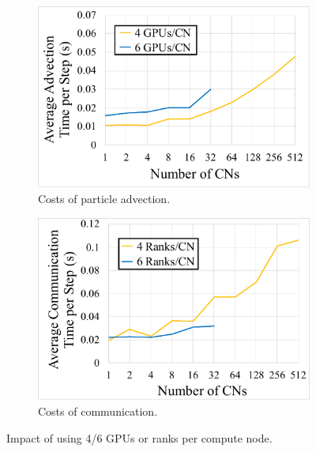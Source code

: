 \begin{figure}[!b]
\begin{subfigure}{0.495\linewidth}
\centering
\includegraphics[width=\linewidth]{Images/advection_time2.pdf}
\caption{Costs of particle advection.}
\label{fig:advection}
\end{subfigure}
\begin{subfigure}{0.495\linewidth}
\centering
\includegraphics[width=\linewidth]{Images/communication_time2.pdf}
\caption{Costs of communication.}
\label{fig:communication}
\end{subfigure}
\caption{Impact of using 4/6 GPUs or ranks per compute node.}
\label{fig:gpu_nodes}
\end{figure}
